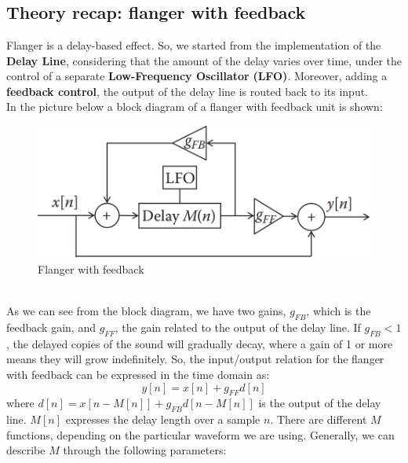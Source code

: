 \documentclass[a4paper,12pt]{report}
\begin{document}
\chapter{}
\section{Theory recap: flanger with feedback}
Flanger is a delay-based effect. So, we started from the implementation of the \textbf{Delay Line}, considering that the amount of the delay varies over time, under the control of a separate \textbf{Low-Frequency Oscillator} \textbf{(LFO)}. Moreover, adding a \textbf{feedback control}, the output of the delay line is routed back to its input. %
\\In the picture below a block diagram of a flanger with feedback unit is shown:
\begin{figure}[h]
\centering
\includegraphics[scale=.45]{db_flanger.png}
\caption{Flanger with feedback}
\end{figure}
\\As we can see from the block diagram, we have two gains, $\textit{g}_{FB}$, which is the feedback gain, and $\textit{g}_{FF}$, the gain related to the output of the delay line. If $\textit{g}_{FB}<1$, the delayed copies of the sound will gradually decay, where a gain of 1 or more means they will grow indefinitely.
So, the input/output relation for the flanger with feedback can be expressed in the time domain as:
\[ y[n] = x[n]+ g_{FF}d[n]\] where $d[n]=x[n-M[n]]+g_{FB}d[n-M[n]] $ is the output of the delay line. $M[n]$ expresses the delay length over a sample $n$. There are different $M$ functions, depending on the particular waveform we are using. Generally, we can describe $M$ through the following parameters: 
\end{document}
